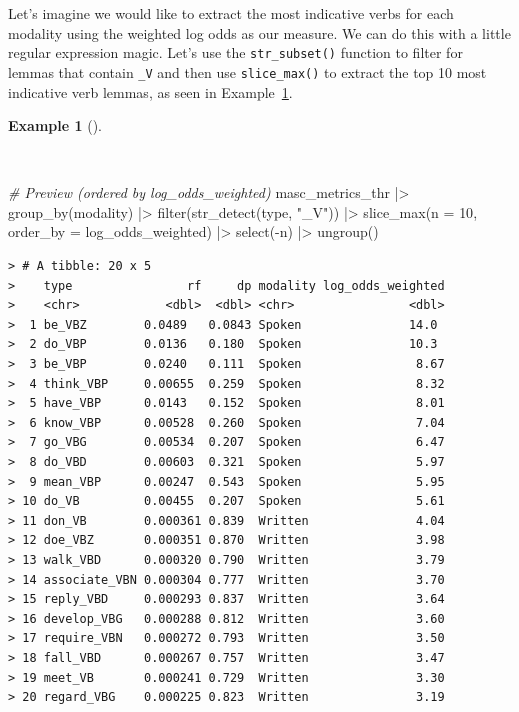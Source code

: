\documentclass[
  letterpaper,
]{latex/krantz}
\newenvironment{Shaded}{\begin{snugshade}}{\end{snugshade}}
\newcommand{\AttributeTok}[1]{\textcolor[rgb]{0.00,0.00,0.00}{#1}}
\newcommand{\CommentTok}[1]{\textcolor[rgb]{0.00,0.00,0.00}{\textit{#1}}}
\newcommand{\DecValTok}[1]{\textcolor[rgb]{0.00,0.00,0.00}{#1}}
\newcommand{\FunctionTok}[1]{\textcolor[rgb]{0.00,0.00,0.00}{#1}}
\newcommand{\NormalTok}[1]{\textcolor[rgb]{0.00,0.00,0.00}{#1}}
\newcommand{\SpecialCharTok}[1]{\textcolor[rgb]{0.00,0.00,0.00}{#1}}
\newcommand{\StringTok}[1]{\textcolor[rgb]{0.00,0.00,0.00}{#1}}
\theoremstyle{definition}
\newtheorem{example}{Example}[chapter]
\theoremstyle{remark}
\begin{document}
Let's imagine we would like to extract the most indicative verbs for
each modality using the weighted log odds as our measure. We can do this
with a little regular expression magic. Let's use the
\texttt{str\_subset()} function to filter for lemmas that contain
\texttt{\_V} and then use \texttt{slice\_max()} to extract the top 10
most indicative verb lemmas, as seen in
Example~\ref{exm-eda-masc-log-odds-weighted-verbs}.

\begin{example}[]\protect\hypertarget{exm-eda-masc-log-odds-weighted-verbs}{}\label{exm-eda-masc-log-odds-weighted-verbs}

~

\begin{Shaded}
\begin{Highlighting}[]
\CommentTok{\# Preview (ordered by log\_odds\_weighted)}
\NormalTok{masc\_metrics\_thr }\SpecialCharTok{|\textgreater{}}
  \FunctionTok{group\_by}\NormalTok{(modality) }\SpecialCharTok{|\textgreater{}}
  \FunctionTok{filter}\NormalTok{(}\FunctionTok{str\_detect}\NormalTok{(type, }\StringTok{"\_V"}\NormalTok{)) }\SpecialCharTok{|\textgreater{}}
  \FunctionTok{slice\_max}\NormalTok{(}\AttributeTok{n =} \DecValTok{10}\NormalTok{, }\AttributeTok{order\_by =}\NormalTok{ log\_odds\_weighted) }\SpecialCharTok{|\textgreater{}}
  \FunctionTok{select}\NormalTok{(}\SpecialCharTok{{-}}\NormalTok{n) }\SpecialCharTok{|\textgreater{}}
  \FunctionTok{ungroup}\NormalTok{()}
\end{Highlighting}
\end{Shaded}

\begin{verbatim}
> # A tibble: 20 x 5
>    type                rf     dp modality log_odds_weighted
>    <chr>            <dbl>  <dbl> <chr>                <dbl>
>  1 be_VBZ        0.0489   0.0843 Spoken               14.0 
>  2 do_VBP        0.0136   0.180  Spoken               10.3 
>  3 be_VBP        0.0240   0.111  Spoken                8.67
>  4 think_VBP     0.00655  0.259  Spoken                8.32
>  5 have_VBP      0.0143   0.152  Spoken                8.01
>  6 know_VBP      0.00528  0.260  Spoken                7.04
>  7 go_VBG        0.00534  0.207  Spoken                6.47
>  8 do_VBD        0.00603  0.321  Spoken                5.97
>  9 mean_VBP      0.00247  0.543  Spoken                5.95
> 10 do_VB         0.00455  0.207  Spoken                5.61
> 11 don_VB        0.000361 0.839  Written               4.04
> 12 doe_VBZ       0.000351 0.870  Written               3.98
> 13 walk_VBD      0.000320 0.790  Written               3.79
> 14 associate_VBN 0.000304 0.777  Written               3.70
> 15 reply_VBD     0.000293 0.837  Written               3.64
> 16 develop_VBG   0.000288 0.812  Written               3.60
> 17 require_VBN   0.000272 0.793  Written               3.50
> 18 fall_VBD      0.000267 0.757  Written               3.47
> 19 meet_VB       0.000241 0.729  Written               3.30
> 20 regard_VBG    0.000225 0.823  Written               3.19
\end{verbatim}

\end{example}
\end{document}
